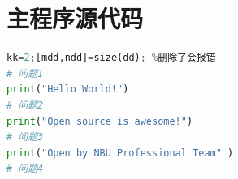 \documentclass[a4paper,10pt]{my_paper}
\numberwithin{equation}{section}
\begin{document}
\newpage

\appendix

\section{主程序源代码}

\begin{lstlisting}[language=Python]%设置不同语言即可。
kk=2;[mdd,ndd]=size(dd); %删除了会报错
# 问题1
print("Hello World!")
# 问题2
print("Open source is awesome!")
# 问题3
print("Open by NBU Professional Team" )
# 问题4

\end{lstlisting}
\end{document}
